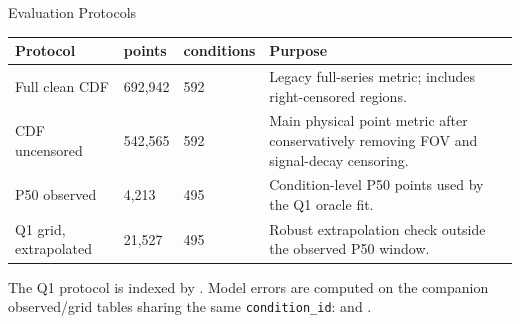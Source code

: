 \documentclass[UTF8,aspectratio=169]{ctexbeamer}
\begin{document}
\begin{frame}{Evaluation Protocols}
\small
\begin{center}
\renewcommand{\arraystretch}{1.16}
\setlength{\tabcolsep}{4pt}
\begin{tabular}{@{}L{3.3cm}R{2.0cm}R{2.0cm}L{6.4cm}@{}}
\toprule
\textbf{Protocol} & \textbf{points} & \textbf{conditions} & \textbf{Purpose} \\
\midrule
Full clean CDF & 692{,}942 & 592 & Legacy full-series metric; includes right-censored regions. \\
CDF uncensored & 542{,}565 & 592 & Main physical point metric after conservatively removing FOV and signal-decay censoring. \\
P50 observed & 4{,}213 & 495 & Condition-level P50 points used by the Q1 oracle fit. \\
Q1 grid, extrapolated & 21{,}527 & 495 & Robust extrapolation check outside the observed P50 window. \\
\bottomrule
\end{tabular}
\end{center}

\vspace{0.55em}
\footnotesize
The Q1 protocol is indexed by .
Model errors are computed on the companion observed/grid tables sharing the same
\texttt{condition\_id}:  and .
\end{frame}
\end{document}
